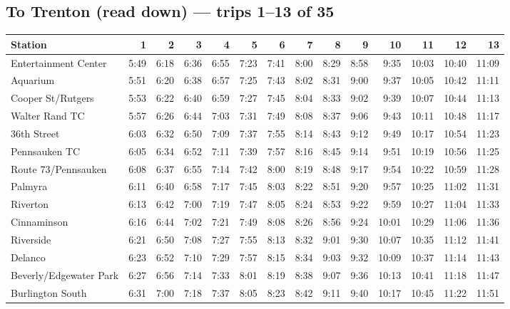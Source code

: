 \subsection*{To Trenton (read down) --- trips 1--13 of 35}
\begin{center}\footnotesize\setlength{\tabcolsep}{3pt}\begin{tabular}{@{}lrrrrrrrrrrrrr@{}}\toprule
Station & 1 & 2 & 3 & 4 & 5 & 6 & 7 & 8 & 9 & 10 & 11 & 12 & 13 \\\midrule
Entertainment Center & 5:49 & 6:18 & 6:36 & 6:55 & 7:23 & 7:41 & 8:00 & 8:29 & 8:58 & 9:35 & 10:03 & 10:40 & 11:09 \\
Aquarium & 5:51 & 6:20 & 6:38 & 6:57 & 7:25 & 7:43 & 8:02 & 8:31 & 9:00 & 9:37 & 10:05 & 10:42 & 11:11 \\
Cooper St/Rutgers & 5:53 & 6:22 & 6:40 & 6:59 & 7:27 & 7:45 & 8:04 & 8:33 & 9:02 & 9:39 & 10:07 & 10:44 & 11:13 \\
Walter Rand TC & 5:57 & 6:26 & 6:44 & 7:03 & 7:31 & 7:49 & 8:08 & 8:37 & 9:06 & 9:43 & 10:11 & 10:48 & 11:17 \\
36th Street & 6:03 & 6:32 & 6:50 & 7:09 & 7:37 & 7:55 & 8:14 & 8:43 & 9:12 & 9:49 & 10:17 & 10:54 & 11:23 \\
Pennsauken TC & 6:05 & 6:34 & 6:52 & 7:11 & 7:39 & 7:57 & 8:16 & 8:45 & 9:14 & 9:51 & 10:19 & 10:56 & 11:25 \\
Route 73/Pennsauken & 6:08 & 6:37 & 6:55 & 7:14 & 7:42 & 8:00 & 8:19 & 8:48 & 9:17 & 9:54 & 10:22 & 10:59 & 11:28 \\
Palmyra & 6:11 & 6:40 & 6:58 & 7:17 & 7:45 & 8:03 & 8:22 & 8:51 & 9:20 & 9:57 & 10:25 & 11:02 & 11:31 \\
Riverton & 6:13 & 6:42 & 7:00 & 7:19 & 7:47 & 8:05 & 8:24 & 8:53 & 9:22 & 9:59 & 10:27 & 11:04 & 11:33 \\
Cinnaminson & 6:16 & 6:44 & 7:02 & 7:21 & 7:49 & 8:08 & 8:26 & 8:56 & 9:24 & 10:01 & 10:29 & 11:06 & 11:36 \\
Riverside & 6:21 & 6:50 & 7:08 & 7:27 & 7:55 & 8:13 & 8:32 & 9:01 & 9:30 & 10:07 & 10:35 & 11:12 & 11:41 \\
Delanco & 6:23 & 6:52 & 7:10 & 7:29 & 7:57 & 8:15 & 8:34 & 9:03 & 9:32 & 10:09 & 10:37 & 11:14 & 11:43 \\
Beverly/Edgewater Park & 6:27 & 6:56 & 7:14 & 7:33 & 8:01 & 8:19 & 8:38 & 9:07 & 9:36 & 10:13 & 10:41 & 11:18 & 11:47 \\
Burlington South & 6:31 & 7:00 & 7:18 & 7:37 & 8:05 & 8:23 & 8:42 & 9:11 & 9:40 & 10:17 & 10:45 & 11:22 & 11:51 \\

\end{tabular}
\end{center}
